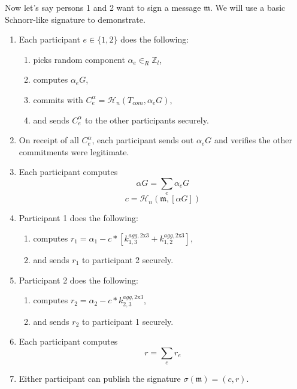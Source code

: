 Now let's say persons 1 and 2 want to sign a message $\mathfrak{m}$. We will use a basic Schnorr-like signature to demonstrate.
\begin{enumerate}
    \item Each participant $e \in \{1,2\}$ does the following:
    \begin{enumerate}
        \item picks random component $\alpha_e \in_R \mathbb{Z}_l$,
        \item computes $\alpha_e G$,
        \item commits with $C^{\alpha}_{e} = \mathcal{H}_n(T_{com},\alpha_e G)$,
        \item and sends $C^{\alpha}_{e}$ to the other participants securely.
    \end{enumerate}
    \item On receipt of all $C^{\alpha}_{e}$, each participant sends out $\alpha_e G$ and verifies the other commitments were legitimate.
    \item Each participant computes
    \[\alpha G = \sum_e \alpha_e G\]
    \[c = \mathcal{H}_n(\mathfrak{m},[\alpha G])\]
    \item Participant 1 does the following:
    \begin{enumerate}
        \item computes $r_1 = \alpha_1 - c*[k^{agg,\textrm{2x3}}_{1,3} + k^{agg,\textrm{2x3}}_{1,2}]$,
        \item and sends $r_1$ to participant 2 securely.
    \end{enumerate}
    \item Participant 2 does the following:
    \begin{enumerate}
        \item computes $r_2 = \alpha_2 - c*k^{agg,\textrm{2x3}}_{2,3}$,
        \item and sends $r_2$ to participant 1 securely.
    \end{enumerate}
    \item Each participant computes
    \[r = \sum_e r_e\]
    \item Either participant can publish the signature $\sigma(\mathfrak{m}) = (c,r)$.
\end{enumerate}

